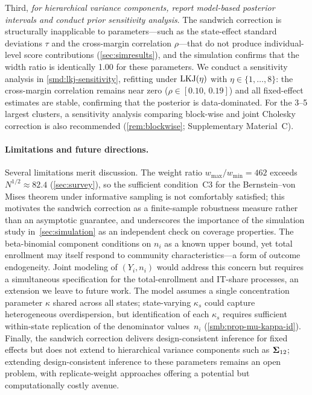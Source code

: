 Third, \emph{for hierarchical variance components, report model-based
posterior intervals and conduct prior sensitivity analysis}.
The sandwich correction is structurally inapplicable to
parameters---such as the state-effect standard deviations $\tau$ and
the cross-margin correlation $\rho$---that do not produce
individual-level score contributions (\cref{sec:simresults}), and the
simulation confirms that the width ratio is identically 1.00 for these
parameters. We conduct a sensitivity analysis in
\cref{smd:lkj-sensitivity}, refitting under $\operatorname{LKJ}(\eta)$ with
$\eta \in \{1,\ldots,8\}$: the cross-margin correlation remains near
zero ($\hat{\rho} \in [0.10,\,0.19]$) and all fixed-effect estimates
are stable, confirming that the posterior is data-dominated.
For the 3--5 largest clusters, a sensitivity analysis comparing
block-wise and joint Cholesky correction is also recommended
(\cref{rem:blockwise}; Supplementary Material~C).


\paragraph{Limitations and future directions.}
Several limitations merit discussion.
The weight ratio $w_{\max}/w_{\min} = 462$ exceeds
$N^{1/2} \approx 82.4$ (\cref{sec:survey}), so the sufficient
condition~C3 for the Bernstein--von Mises theorem under informative
sampling is not comfortably satisfied; this motivates the sandwich
correction as a finite-sample robustness measure rather than an
asymptotic guarantee, and underscores the importance of the
simulation study in~\cref{sec:simulation} as an independent
check on coverage properties.
The beta-binomial component conditions on $n_i$ as a known upper
bound, yet total enrollment may itself respond to community
characteristics---a form of outcome endogeneity.  Joint modeling of
$(Y_i, n_i)$ would address this concern but requires a simultaneous
specification for the total-enrollment and IT-share processes, an
extension we leave to future work.
The model assumes a single concentration parameter $\kappa$ shared
across all states; state-varying $\kappa_s$ could capture
heterogeneous overdispersion, but identification of each $\kappa_s$
requires sufficient within-state replication of the denominator
values~$n_i$ (\cref{smb:prop-mu-kappa-id}).
Finally, the sandwich correction delivers design-consistent inference
for fixed effects but does not extend to hierarchical variance
components such as $\boldsymbol{\Sigma}_{12}$; extending design-consistent
inference to these parameters remains an open problem, with
replicate-weight approaches offering a potential but computationally
costly avenue.

